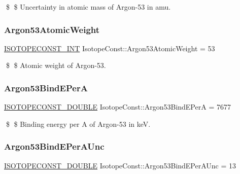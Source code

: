 \$ \$ Uncertainty in atomic mass of Argon-\/53 in amu. \mbox{\label{group___isotope_const-_argon-_ar53_gaa3371fa5208de886f7baab8f9412d42f}} 
\subsubsection{\texorpdfstring{Argon53\+Atomic\+Weight}{Argon53AtomicWeight}}
{\footnotesize\ttfamily \mbox{\hyperlink{group___isotope_const-_macros_ga5f18360b3e99483a35c32d789e62621c}{I\+S\+O\+T\+O\+P\+E\+C\+O\+N\+S\+T\+\_\+\+I\+NT}} Isotope\+Const\+::\+Argon53\+Atomic\+Weight = 53}

\$ \$ Atomic weight of Argon-\/53. \mbox{\label{group___isotope_const-_argon-_ar53_ga3009ef067467267aaff9003e371931fc}} 
\subsubsection{\texorpdfstring{Argon53\+Bind\+E\+PerA}{Argon53BindEPerA}}
{\footnotesize\ttfamily \mbox{\hyperlink{group___isotope_const-_macros_ga8f45a7272ce02c0b4c65c44636ed719a}{I\+S\+O\+T\+O\+P\+E\+C\+O\+N\+S\+T\+\_\+\+D\+O\+U\+B\+LE}} Isotope\+Const\+::\+Argon53\+Bind\+E\+PerA = 7677}

\$ \$ Binding energy per A of Argon-\/53 in keV. \mbox{\label{group___isotope_const-_argon-_ar53_gac60ca5a0ae29824d85a9580d180d537c}} 
\subsubsection{\texorpdfstring{Argon53\+Bind\+E\+Per\+A\+Unc}{Argon53BindEPerAUnc}}
{\footnotesize\ttfamily \mbox{\hyperlink{group___isotope_const-_macros_ga8f45a7272ce02c0b4c65c44636ed719a}{I\+S\+O\+T\+O\+P\+E\+C\+O\+N\+S\+T\+\_\+\+D\+O\+U\+B\+LE}} Isotope\+Const\+::\+Argon53\+Bind\+E\+Per\+A\+Unc = 13}

